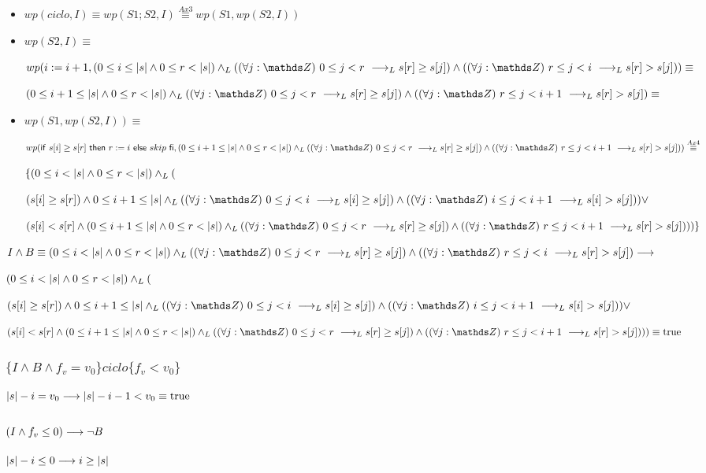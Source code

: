 \documentclass{article}
\begin{document}
\begin{itemize}
    \item $wp(ciclo, I) \equiv wp(S1;S2, I) \stackrel{Ax3}{\equiv} wp(S1,wp(S2, I))$
    \item $wp(S2,I) \equiv$
    
    $wp(i:= i + 1, (0 \leq i \leq \longitud{s} \wedge 0 \leq r < \longitud{s}) \yLuego (\paraTodo{j}{0}{r} \implicaLuego s[r] \geq s[j]) \wedge (\paraTodo{j}{r}{i}\implicaLuego s[r] > s[j])) \equiv$

    $(0 \leq i + 1 \leq \longitud{s} \wedge 0 \leq r < \longitud{s}) \yLuego (\paraTodo{j}{0}{r} \implicaLuego s[r] \geq s[j]) \wedge (\paraTodo{j}{r}{i + 1}\implicaLuego s[r] > s[j]) \equiv$

    \item $wp(S1,wp(S2, I)) \equiv$

    $wp(\IfThenElse{s[i] \geq s[r]}{r:= i}{skip}, (0 \leq i + 1 \leq \longitud{s} \wedge 0 \leq r < \longitud{s}) \yLuego (\paraTodo{j}{0}{r} \implicaLuego s[r] \geq s[j]) \wedge (\paraTodo{j}{r}{i + 1}\implicaLuego s[r] > s[j])) \stackrel{Ax4}{\equiv}$

    $ \{ (0 \leq i < |s| \wedge 0 \leq r < |s|) \land _L ( $

    $ ( s[i] \geq s[r] ) \wedge 0 \leq i + 1 \leq \longitud{s} \yLuego (\paraTodo{j}{0}{i} \implicaLuego s[i] \geq s[j]) \wedge (\paraTodo{j}{i}{i + 1}\implicaLuego s[i] > s[j]) ) \vee $

    $ ( s[i] < s[r] \wedge (0 \leq i + 1 \leq \longitud{s} \wedge 0 \leq r < \longitud{s}) \yLuego (\paraTodo{j}{0}{r} \implicaLuego s[r] \geq s[j]) \wedge (\paraTodo{j}{r}{i + 1}\implicaLuego s[r] > s[j])) )\} $

\end{itemize}

$I \wedge B \equiv (0 \leq i < \longitud{s} \wedge 0 \leq r < \longitud{s}) \yLuego (\paraTodo{j}{0}{r} \implicaLuego s[r] \geq s[j]) \wedge (\paraTodo{j}{r}{i}\implicaLuego s[r] > s[j]) \implica $ 

$ (0 \leq i < |s| \wedge 0 \leq r < |s|) \land _L ( $

$ ( s[i] \geq s[r] ) \wedge 0 \leq i + 1 \leq \longitud{s} \yLuego (\paraTodo{j}{0}{i} \implicaLuego s[i] \geq s[j]) \wedge (\paraTodo{j}{i}{i + 1}\implicaLuego s[i] > s[j]) ) \vee $

$ ( s[i] < s[r] \wedge (0 \leq i + 1 \leq \longitud{s} \wedge 0 \leq r < \longitud{s}) \yLuego (\paraTodo{j}{0}{r} \implicaLuego s[r] \geq s[j]) \wedge (\paraTodo{j}{r}{i + 1}\implicaLuego s[r] > s[j])) ) \equiv \True$

\subsubsection*{$ \{I \wedge B \wedge f_{v}=v_{0}\} ciclo \{f_{v}<v_{0}\} $}

    $|s| - i =v_{0} \longrightarrow |s| - i - 1 < v_{0} \equiv \mathrm{true} $

\subsubsection*{$ (I \wedge f_{v} \leq 0) \longrightarrow \neg B$}

    $|s| - i \leq 0 \longrightarrow i \geq |s| $
\end{document}
